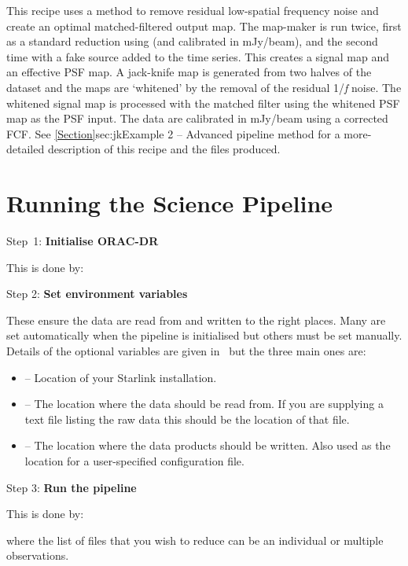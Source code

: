 This recipe uses a
method to remove residual low-spatial frequency noise and create an
optimal matched-filtered output map. The map-maker is run twice, first
as a standard reduction using  (and
calibrated in mJy/beam), and the second time with a fake source added
to the time series. This creates a signal map and an effective PSF
map. A jack-knife map is generated from two halves of the dataset and
the maps are `whitened' by the removal of the residual 1/\emph{f}
noise. The whitened signal map is processed with the matched filter
using the whitened PSF map as the PSF input. The data are calibrated
in mJy/beam using a corrected FCF.  See \cref{Section}{sec:jk}{Example
  2 -- Advanced pipeline method} for a more-detailed description of
this recipe and the files produced.


\section{Running the Science Pipeline}
\label{sec:plsteps}


\begin{aligndesc}
\item[Step~1:]
\textbf{Initialise ORAC-DR}

This is done by:
\begin{terminalv}
\end{terminalv}

\item[Step 2:]
\textbf{Set environment variables}

These ensure the data are read from and written to the right
places. Many are set automatically when the pipeline is initialised
but others must be set manually. Details of the optional variables are
given in \pipelinesun\ but the three main ones are:

\begin{itemize}\itemsep-0.1em
\item {} -- Location of your Starlink installation.
\item {} -- The location where the data should be read from.
If you are supplying a text file listing the raw data this should be the
location of that file.
\item {} -- The location where the data products should be
written. Also used as the location for a user-specified configuration file.
\end{itemize}

\item[Step 3:]
\textbf{Run the pipeline}

This is done by:
\begin{terminalv}
\end{terminalv}

where the list of files that you wish to reduce can be
an individual or multiple observations.

\end{aligndesc}


